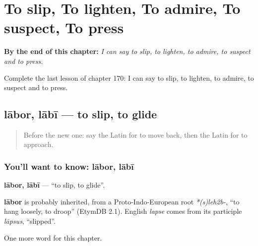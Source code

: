 
\chapter{To slip, To lighten, To admire, To suspect, To press}
\label{ch:la-to-slip-to-lighten-to-admire-to-suspect-to-press}

\begin{chapteropening}
\textbf{By the end of this chapter:} \emph{I can say to slip, to lighten, to admire, to suspect and to press.}

Complete the last lesson of chapter 170: I can say to slip, to lighten, to admire, to suspect and to press.
\end{chapteropening}

\section[lābor, lābī]{lābor, lābī — to slip, to glide}

\label{lesson:LA-C170-labor}



\begin{quote}
Before the new one: say the Latin for to move back, then the Latin for to approach.
\end{quote}

\subsection*{You'll want to know: lābor, lābī}
\textbf{lābor, lābī} — \textquotedblleft{}to slip, to glide\textquotedblright{}.

\begin{cousinweb}
\textbf{lābor} is probably inherited, from a Proto-Indo-European root \emph{*(s)leh2b-}, \textquotedblleft{}to hang loosely, to droop\textquotedblright{} (EtymDB 2.1). English \emph{lapse} comes from its participle \emph{lāpsus}, \textquotedblleft{}slipped\textquotedblright{}.
\end{cousinweb}

\begin{grammarlens}[title={What you've built}]
One more word for this chapter.
\end{grammarlens}

